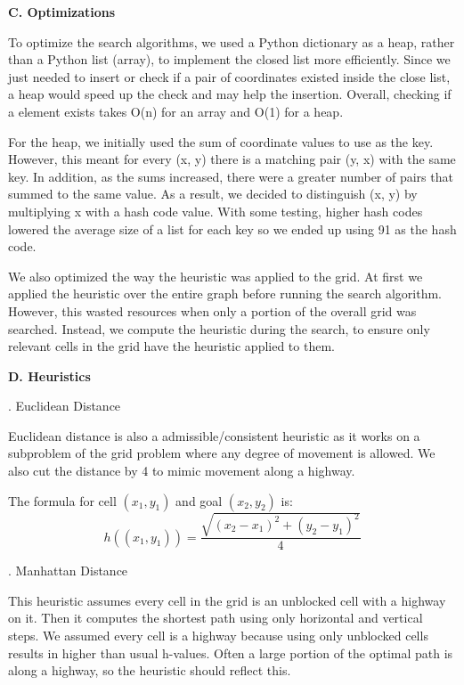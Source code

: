 \documentclass[12pt, letterpaper]{article}
\begin{document}
\pagebreak %

\noindent \textbf{C. Optimizations}

To optimize the search algorithms, we used a Python dictionary as a heap, rather than a Python list (array), to implement the closed list more efficiently. Since we just needed to insert or check if a pair of coordinates existed inside the close list, a heap would speed up the check and may help the insertion. Overall, checking if a element exists takes O(n) for an array and O(1) for a heap.

For the heap, we initially used the sum of coordinate values to use as the key. However, this meant for every (x, y) there is a matching pair (y, x) with the same key. In addition, as the sums increased, there were a greater number of pairs that summed to the same value. As a result, we decided to distinguish (x, y) by multiplying x with a hash code value. With some testing, higher hash codes lowered the average size of a list for each key so we ended up using 91 as the hash code. 

We also optimized the way the heuristic was applied to the grid. At first we applied the heuristic over the entire graph before running the search algorithm. However, this wasted resources when only a portion of the overall grid was searched. Instead, we compute the heuristic during the search, to ensure only relevant cells in the grid have the heuristic applied to them.

\pagebreak %

\noindent \textbf{D. Heuristics}

. Euclidean Distance

Euclidean distance is also a admissible/consistent heuristic as it works on a subproblem of the grid problem where any degree of movement is allowed. We also cut the distance by 4 to mimic movement along a highway.

The formula for cell $(x_1, y_1)$ and goal $(x_2, y_2)$ is:
$$h((x_1,y_1)) = \frac{\sqrt{(x_2-x_1)^2 + (y_2-y_1)^2}}{4}$$

\bigskip
{}. Manhattan Distance

This heuristic assumes every cell in the grid is an unblocked cell with a highway on it. Then it computes the shortest path using only horizontal and vertical steps. We assumed every cell is a highway because using only unblocked cells results in higher than usual h-values. Often a large portion of the optimal path is along a highway, so the heuristic should reflect this.
\end{document}
